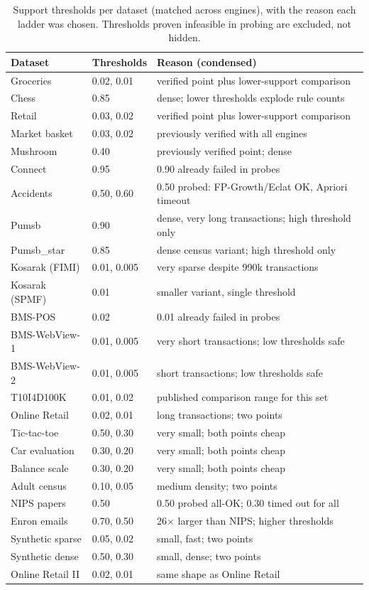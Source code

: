 \documentclass[twocolumn,10pt]{article}
\begin{document}
\begin{table}[t]
\centering
\footnotesize
\caption{Support thresholds per dataset (matched across engines),
with the reason each ladder was chosen. Thresholds proven infeasible
in probing are excluded, not hidden.}
\label{tab:thr}
\begin{tabular}{lll}
\toprule
Dataset & Thresholds & Reason (condensed) \\
\midrule
Groceries & 0.02, 0.01 & verified point plus lower-support comparison \\
Chess & 0.85 & dense; lower thresholds explode rule counts \\
Retail & 0.03, 0.02 & verified point plus lower-support comparison \\
Market basket & 0.03, 0.02 & previously verified with all engines \\
Mushroom & 0.40 & previously verified point; dense \\
Connect & 0.95 & 0.90 already failed in probes \\
Accidents & 0.50, 0.60 & 0.50 probed: FP-Growth/Eclat OK, Apriori timeout \\
Pumsb & 0.90 & dense, very long transactions; high threshold only \\
Pumsb\_star & 0.85 & dense census variant; high threshold only \\
Kosarak (FIMI) & 0.01, 0.005 & very sparse despite 990k transactions \\
Kosarak (SPMF) & 0.01 & smaller variant, single threshold \\
BMS-POS & 0.02 & 0.01 already failed in probes \\
BMS-WebView-1 & 0.01, 0.005 & very short transactions; low thresholds safe \\
BMS-WebView-2 & 0.01, 0.005 & short transactions; low thresholds safe \\
T10I4D100K & 0.01, 0.02 & published comparison range for this set \\
Online Retail & 0.02, 0.01 & long transactions; two points \\
Tic-tac-toe & 0.50, 0.30 & very small; both points cheap \\
Car evaluation & 0.30, 0.20 & very small; both points cheap \\
Balance scale & 0.30, 0.20 & very small; both points cheap \\
Adult census & 0.10, 0.05 & medium density; two points \\
NIPS papers & 0.50 & 0.50 probed all-OK; 0.30 timed out for all \\
Enron emails & 0.70, 0.50 & 26$\times$ larger than NIPS; higher thresholds \\
Synthetic sparse & 0.05, 0.02 & small, fast; two points \\
Synthetic dense & 0.50, 0.30 & small, dense; two points \\
Online Retail II & 0.02, 0.01 & same shape as Online Retail \\
\bottomrule
\end{tabular}
\end{table}
\end{document}
